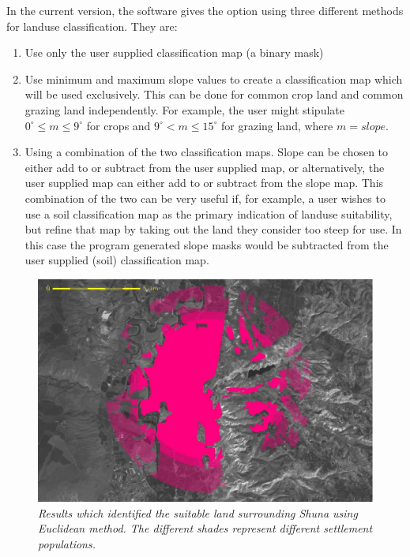   In the current version, the software gives the option using three different
  methods for landuse classification.  They are: 
  \begin{enumerate} 
    \item  Use only the user supplied classification map (a binary mask) 
    \item  Use minimum and maximum slope values to create a classification map
      which will be used exclusively.  This can be done for common crop land and
      common grazing land independently.  For example, the user might stipulate
      $0^\circ \leq m \leq 9^\circ$ for crops and $9^\circ < m \leq 15^\circ$
      for grazing land, where $m=slope$.  
    \item  Using a combination of the two classification maps.  Slope can be
      chosen to either add to or subtract from the user supplied map, or 
      alternatively, the user supplied map can either add to or subtract from
      the slope map.  This combination of the two can be very useful if, for 
      example, a user wishes to use a soil classification map as the primary
      indication of landuse suitability, but refine that map by taking out the
      land they consider too steep for use. In this case the program generated
      slope masks would be subtracted from the user supplied (soil) classification map.  
  \end{enumerate}
\begin{figure}[htbp] %
  \includegraphics[scale=0.225]{./images/landcatchment.jpg}
  \caption{\label{fig:landCatchment}\textit{Results which identified the suitable land
    surrounding Shuna using Euclidean method. The different shades represent
    different settlement populations.}}
\end{figure}
